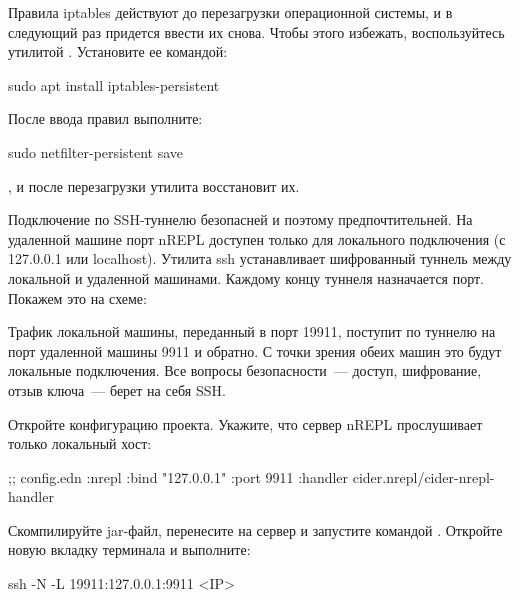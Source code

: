 Правила iptables действуют до перезагрузки операционной системы, и в следующий раз придется ввести их снова. Чтобы этого избежать, воспользуйтесь утилитой . Установите ее командой:

\begin{english}
  \begin{bash}
sudo apt install iptables-persistent
  \end{bash}
\end{english}

После ввода правил выполните:

\begin{english}
  \begin{bash}
sudo netfilter-persistent save
  \end{bash}
\end{english}

\noindent
, и после перезагрузки утилита восстановит их.

Подключение по SSH-туннелю безопасней и поэтому предпочтительней. На удаленной машине порт nREPL доступен только для локального подключения (с 127.0.0.1 или localhost). Утилита ssh устанавливает шифрованный туннель между локальной и удаленной машинами. Каждому концу туннеля назначается порт. Покажем это на схеме:

\begin{figure}[H]
  \centering
  
  \label{fig:chart-repl-02}
\end{figure}

Трафик локальной машины, переданный в порт 19911, поступит по туннелю на порт удаленной машины 9911 и обратно. С точки зрения обеих машин это будут локальные подключения. Все вопросы безопасности~--- доступ, шифрование, отзыв ключа~--- берет на себя SSH.

Откройте конфигурацию проекта. Укажите, что сервер nREPL прослушивает только локальный хост:

\begin{english}
  \begin{clojure}
;; config.edn
{:nrepl
  {:bind "127.0.0.1"
   :port 9911
   :handler cider.nrepl/cider-nrepl-handler}}
  \end{clojure}
\end{english}

Скомпилируйте jar-файл, перенесите на сервер и запустите командой . Откройте новую вкладку терминала и выполните:

\begin{english}
  \begin{bash}
ssh -N -L 19911:127.0.0.1:9911 <IP>
  \end{bash}
\end{english}

